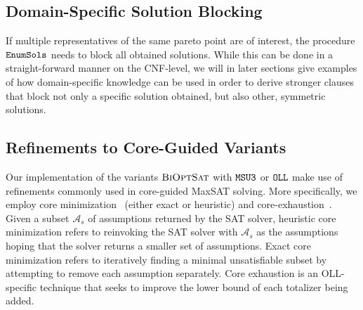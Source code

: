 \subsection{Domain-Specific Solution Blocking}

If multiple representatives of the same pareto point are of interest, the procedure $\texttt{EnumSols}$ needs to block all obtained solutions. 
While this can be done in a straight-forward manner on the CNF-level, we will in later sections give examples of how domain-specific knowledge can be used in order to derive stronger clauses that block not only a specific solution obtained, but also other, symmetric solutions.

\subsection{Refinements to Core-Guided Variants}

Our implementation of the variants $\textsc{BiOptSat}$ with $\texttt{MSU3}$ or $\texttt{OLL}$ make use of refinements commonly used in core-guided MaxSAT solving.
More specifically, we employ core minimization~\autocite{DBLP:journals/jsat/IgnatievMM19} (either exact or heuristic) and core-exhaustion~\autocite{DBLP:journals/jsat/IgnatievMM19,DBLP:conf/cp/AnsoteguiBGL13}.
Given a subset $\mathcal{A}_s$ of assumptions returned by the SAT solver, heuristic core minimization refers to reinvoking the SAT solver with $\mathcal{A}_s$ as the assumptions hoping that the solver returns a smaller set of assumptions.
Exact core minimization refers to iteratively finding a minimal unsatisfiable subset by attempting to remove each assumption separately.
Core exhaustion is an OLL-specific technique that seeks to improve the lower bound of each totalizer being added.
